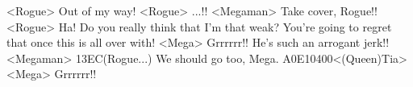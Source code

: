 <Rogue> Out of my way! 
<Rogue> ...!! 
<Megaman> Take cover, Rogue!! 
<Rogue> Ha! Do you really think that 
I'm that weak? You're going to regret that once this is all over with! 
<Mega> Grrrrrr!! He's such an arrogant jerk!! 
<Megaman> {13}{EC}(Rogue...) 
We should go too, Mega. 
{A0}{E1}{04}{00}<(Queen)Tia> 
<Mega> Grrrrrr!! 
